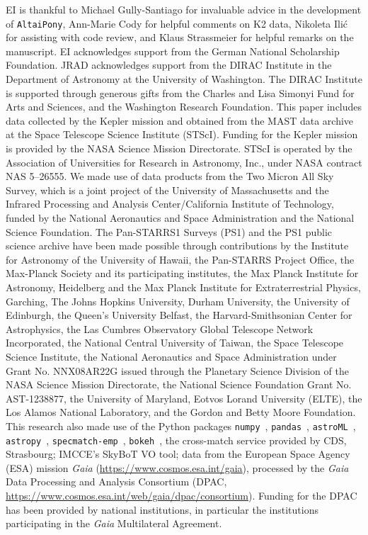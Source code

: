 \documentclass{aa}
\begin{document}
\begin{acknowledgements}
EI is thankful to Michael Gully-Santiago for invaluable advice in the development of \texttt{AltaiPony}, Ann-Marie Cody for helpful comments on K2 data, Nikoleta Ilić for assisting with code review, and Klaus Strassmeier for helpful remarks on the manuscript. EI acknowledges support from the German National Scholarship Foundation. JRAD acknowledges support from the DIRAC Institute in the Department of Astronomy at the University of Washington. The DIRAC Institute is supported through generous gifts from the Charles and Lisa Simonyi Fund for Arts and Sciences, and the Washington Research Foundation.
This paper includes data collected by the Kepler mission and obtained from the MAST data archive at the Space Telescope Science Institute (STScI). Funding for the Kepler mission is provided by the NASA Science Mission Directorate. STScI is operated by the Association of Universities for Research in Astronomy, Inc., under NASA contract NAS 5–26555.
We made use of data products from the Two Micron All Sky Survey, which is a joint project of the University of Massachusetts and the Infrared Processing and Analysis Center/California Institute of Technology, funded by the National Aeronautics and Space Administration and the National Science Foundation. The Pan-STARRS1 Surveys (PS1) and the PS1 public science archive have been made possible through contributions by the Institute for Astronomy of the University of Hawaii, the Pan-STARRS Project Office, the Max-Planck Society and its participating institutes, the Max Planck Institute for Astronomy, Heidelberg and the Max Planck Institute for Extraterrestrial Physics, Garching, The Johns Hopkins University, Durham University, the University of Edinburgh, the Queen’s University Belfast, the Harvard-Smithsonian Center for Astrophysics, the Las Cumbres Observatory Global Telescope Network Incorporated, the National Central University of Taiwan, the Space Telescope Science Institute, the National Aeronautics and Space Administration under Grant No. NNX08AR22G issued through the Planetary Science Division of the NASA Science Mission Directorate, the National Science Foundation Grant No. AST-1238877, the University of Maryland, Eotvos Lorand University (ELTE), the Los Alamos National Laboratory, and the Gordon and Betty Moore Foundation.
This research also made use of the Python packages \texttt{numpy}~\citep{numpy2011}, \texttt{pandas}~\citep{pandas2010}, \texttt{astroML}~\citep{astroML2012, astroML2014}, \texttt{astropy}~\citep{astropy2013}, \texttt{specmatch-emp}~\citep{yee_specmatch_2017}, \texttt{bokeh}~\citep{bokeh}, the cross-match service provided by CDS, Strasbourg; IMCCE's SkyBoT VO tool; data from the European Space Agency (ESA) mission {\it Gaia} (\url{https://www.cosmos.esa.int/gaia}), processed by the {\it Gaia} Data Processing and Analysis Consortium (DPAC, \url{https://www.cosmos.esa.int/web/gaia/dpac/consortium}). Funding for the DPAC has been provided by national institutions, in particular the institutions participating in the {\it Gaia} Multilateral Agreement.
\end{acknowledgements}
\end{document}
